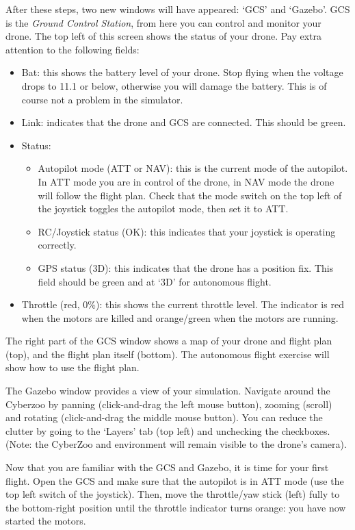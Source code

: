 \documentclass{article}
\begin{document}
After these steps, two new windows will have appeared: `GCS' and `Gazebo'.
GCS is the \emph{Ground Control Station}, from here you can control and monitor your drone.
The top left of this screen shows the status of your drone. Pay extra attention to the following fields:
\begin{itemize}
\item Bat: this shows the battery level of your drone. Stop flying when the voltage drops to 11.1 or below, otherwise you will damage the battery. This is of course not a problem in the simulator.
\item Link: indicates that the drone and GCS are connected. This should be green.
\item Status:
\begin{itemize}
\item Autopilot mode (ATT or NAV): this is the current mode of the autopilot. In ATT mode you are in control of the drone, in NAV mode the drone will follow the flight plan. Check that the mode switch on the top left of the joystick toggles the autopilot mode, then set it to ATT.
\item RC/Joystick status (OK): this indicates that your joystick is operating correctly.
\item GPS status (3D): this indicates that the drone has a position fix. This field should be green and at `3D' for autonomous flight.
\end{itemize}
\item Throttle (red, 0\%): this shows the current throttle level. The indicator is red when the motors are killed and orange/green when the motors are running.
\end{itemize}
The right part of the GCS window shows a map of your drone and flight plan (top), and the flight plan itself (bottom). The autonomous flight exercise will show how to use the flight plan.

\medskip
The Gazebo window provides a view of your simulation. Navigate around the Cyberzoo by panning (click-and-drag the left mouse button), zooming (scroll) and rotating (click-and-drag the middle mouse button).
You can reduce the clutter by going to the `Layers' tab (top left) and unchecking the checkboxes. (Note: the CyberZoo and environment will remain visible to the drone's camera).

\medskip
Now that you are familiar with the GCS and Gazebo, it is time for your first flight.
Open the GCS and make sure that the autopilot is in ATT mode (use the top left switch of the joystick). Then, move the throttle/yaw stick (left) fully to the bottom-right position until the throttle indicator turns orange: you have now started the motors.
\end{document}
